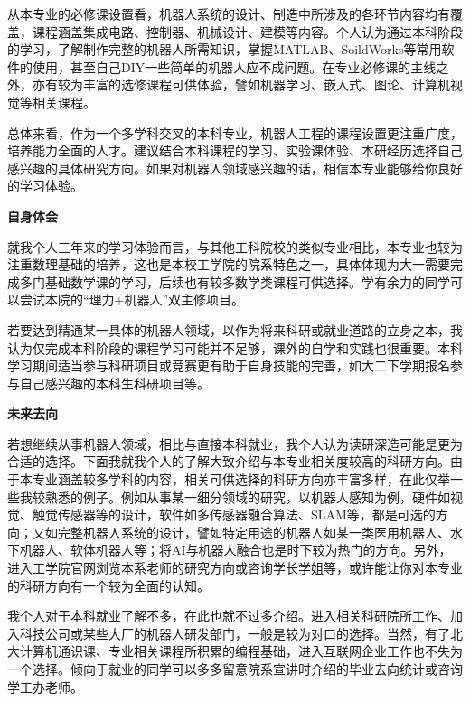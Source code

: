 从本专业的必修课设置看，机器人系统的设计、制造中所涉及的各环节内容均有覆盖，课程涵盖集成电路、控制器、机械设计、建模等内容。个人认为通过本科阶段的学习，了解制作完整的机器人所需知识，掌握MATLAB、SoildWorks等常用软件的使用，甚至自己DIY一些简单的机器人应不成问题。在专业必修课的主线之外，亦有较为丰富的选修课程可供体验，譬如机器学习、嵌入式、图论、计算机视觉等相关课程。

\vspace{10pt}

总体来看，作为一个多学科交叉的本科专业，机器人工程的课程设置更注重广度，培养能力全面的人才。建议结合本科课程的学习、实验课体验、本研经历选择自己感兴趣的具体研究方向。如果对机器人领域感兴趣的话，相信本专业能够给你良好的学习体验。

\vspace{10pt}

\textbf{自身体会}

就我个人三年来的学习体验而言，与其他工科院校的类似专业相比，本专业也较为注重数理基础的培养，这也是本校工学院的院系特色之一，具体体现为大一需要完成多门基础数学课的学习，后续也有较多数学类课程可供选择。学有余力的同学可以尝试本院的“理力+机器人”双主修项目。

\vspace{10pt}

若要达到精通某一具体的机器人领域，以作为将来科研或就业道路的立身之本，我认为仅完成本科阶段的课程学习可能并不足够，课外的自学和实践也很重要。本科学习期间适当参与科研项目或竞赛更有助于自身技能的完善，如大二下学期报名参与自己感兴趣的本科生科研项目等。

\vspace{10pt}

\textbf{未来去向}

若想继续从事机器人领域，相比与直接本科就业，我个人认为读研深造可能是更为合适的选择。下面我就我个人的了解大致介绍与本专业相关度较高的科研方向。由于本专业涵盖较多学科的内容，相关可供选择的科研方向亦丰富多样，在此仅举一些我较熟悉的例子。例如从事某一细分领域的研究，以机器人感知为例，硬件如视觉、触觉传感器等的设计，软件如多传感器融合算法、SLAM等，都是可选的方向；又如完整机器人系统的设计，譬如特定用途的机器人如某一类医用机器人、水下机器人、软体机器人等；将AI与机器人融合也是时下较为热门的方向。另外，进入工学院官网浏览本系老师的研究方向或咨询学长学姐等，或许能让你对本专业的科研方向有一个较为全面的认知。

\vspace{10pt}

我个人对于本科就业了解不多，在此也就不过多介绍。进入相关科研院所工作、加入科技公司或某些大厂的机器人研发部门，一般是较为对口的选择。当然，有了北大计算机通识课、专业相关课程所积累的编程基础，进入互联网企业工作也不失为一个选择。倾向于就业的同学可以多多留意院系宣讲时介绍的毕业去向统计或咨询学工办老师。

